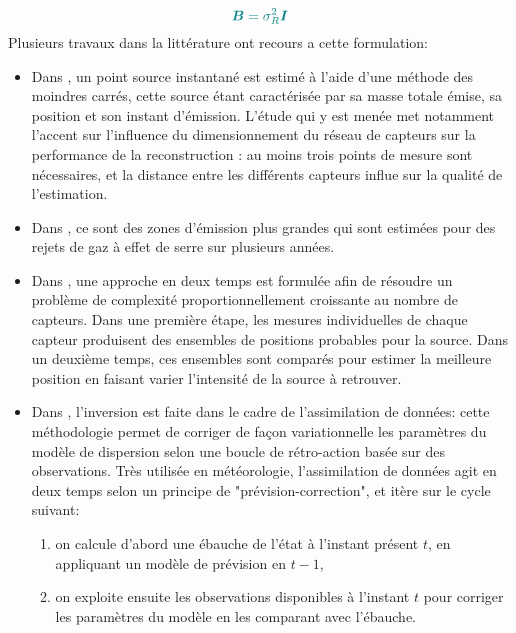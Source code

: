 	\begin{equation}
	\NdFS{
		\MatB = \sigma_R^2 \MatId
	}
	\end{equation}
 Plusieurs travaux dans la littérature ont recours a cette formulation: \\
\begin{itemize}
	\item Dans \cite{Kathirgamanathan2002}, un point source instantané est estimé à l'aide d'une méthode des moindres carrés, cette source étant caractérisée par sa masse totale émise, sa position et son instant d'émission. L'étude qui y est menée met notamment l'accent sur l'influence du dimensionnement du réseau de capteurs sur la performance de la reconstruction : au moins trois points de mesure sont nécessaires, et la distance entre les différents capteurs influe sur la qualité de l'estimation.\\
	
	\item Dans \cite{Ryall2001}, ce sont des zones d'émission plus grandes qui sont estimées pour des rejets de gaz à effet de serre sur plusieurs années. \\
	
	\item Dans \cite{Matthes2005}, une approche en deux temps est formulée afin de résoudre un problème de complexité proportionnellement croissante au nombre de capteurs. Dans une première étape, les mesures individuelles de chaque capteur produisent des ensembles de positions probables pour la source. Dans un deuxième temps, ces ensembles sont comparés pour estimer la meilleure position en faisant varier l'intensité de la source à retrouver. \\
	
	\item  Dans \cite{Robertson1998}, l'inversion est faite dans le cadre de l'assimilation de données: cette méthodologie permet de corriger de façon variationnelle les paramètres du modèle de dispersion selon une boucle de rétro-action basée sur des observations. Très utilisée en météorologie, l'assimilation de données agit en deux temps selon un principe de "prévision-correction", et itère sur le cycle suivant:
	\begin{enumerate}
		\item  on calcule d'abord une ébauche de l'état à l'instant présent $t$, en appliquant un modèle de prévision en $t-1$,
		\item  on exploite ensuite les observations disponibles à l'instant $t$ pour corriger les paramètres du modèle en les comparant avec l'ébauche. \\
	\end{enumerate}
	

\end{itemize}
